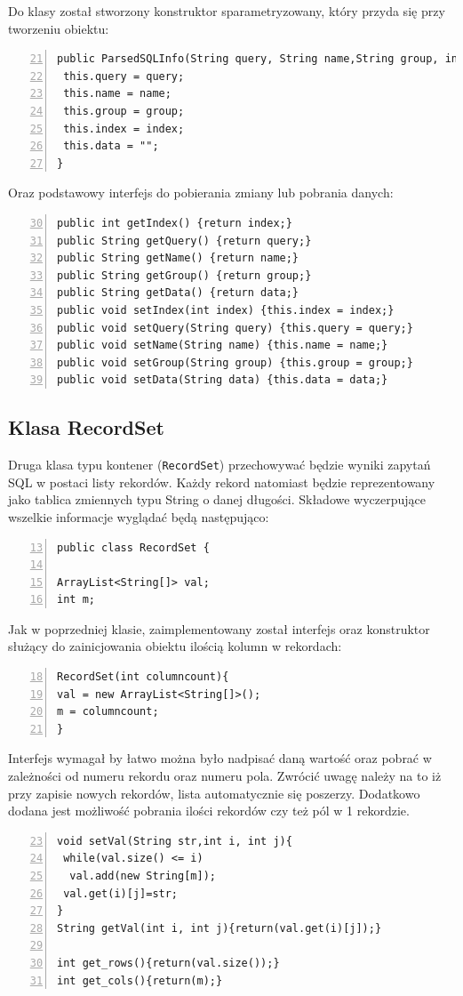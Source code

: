 Do klasy został stworzony konstruktor sparametryzowany, który przyda się przy tworzeniu obiektu:
   
\begin{lstlisting}[numbers=left,firstnumber=21]
public ParsedSQLInfo(String query, String name,String group, int index) {
 this.query = query;
 this.name = name;
 this.group = group;
 this.index = index;
 this.data = "";
}
\end{lstlisting}

Oraz podstawowy interfejs do pobierania zmiany lub pobrania danych:
\begin{lstlisting}[numbers=left,firstnumber=30]
public int getIndex() {return index;}
public String getQuery() {return query;}
public String getName() {return name;}
public String getGroup() {return group;}
public String getData() {return data;}
public void setIndex(int index) {this.index = index;}
public void setQuery(String query) {this.query = query;}
public void setName(String name) {this.name = name;}
public void setGroup(String group) {this.group = group;}
public void setData(String data) {this.data = data;}
\end{lstlisting}

\subsection{Klasa RecordSet}
Druga klasa typu kontener (\texttt{RecordSet}) przechowywać będzie wyniki zapytań SQL w postaci listy rekordów. Każdy rekord natomiast będzie reprezentowany jako tablica zmiennych typu String o danej długości. Składowe wyczerpujące wszelkie informacje wyglądać będą następująco:

\begin{lstlisting}[numbers=left,firstnumber=13]
public class RecordSet {

ArrayList<String[]> val;
int m;
\end{lstlisting}

Jak w poprzedniej klasie, zaimplementowany został interfejs oraz konstruktor służący do zainicjowania obiektu ilością kolumn w rekordach:
 \begin{lstlisting}[numbers=left,firstnumber=18]
RecordSet(int columncount){
val = new ArrayList<String[]>();
m = columncount;
}
 \end{lstlisting}

Interfejs wymagał by łatwo można było nadpisać daną wartość oraz pobrać w zależności od numeru rekordu oraz numeru pola. Zwrócić uwagę należy na to iż przy zapisie nowych rekordów, lista automatycznie się poszerzy. Dodatkowo dodana jest możliwość pobrania ilości rekordów czy też pól w 1 rekordzie.
 \begin{lstlisting}[numbers=left,firstnumber=23]
void setVal(String str,int i, int j){
 while(val.size() <= i)
  val.add(new String[m]);
 val.get(i)[j]=str;
}
String getVal(int i, int j){return(val.get(i)[j]);}   

int get_rows(){return(val.size());}
int get_cols(){return(m);}
\end{lstlisting}

